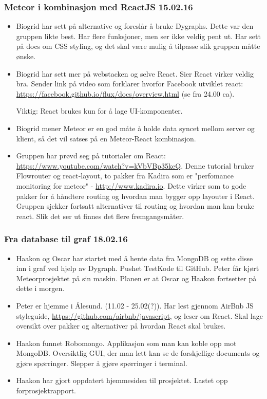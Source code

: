 \documentclass[12pt, oneside]{article}
\begin{document}
\subsubsection{Meteor i kombinasjon med ReactJS 15.02.16}
\begin{itemize}
	\item Biogrid har sett på alternative og foreslår å bruke Dygraphs. Dette var den gruppen likte best. Har flere funksjoner, men ser ikke veldig pent 		ut. Har sett på 		docs om CSS styling, og det skal være mulig å tilpasse slik gruppen måtte ønske.
	\item Biogrid har sett mer på webstacken og selve React. Sier React virker veldig bra. Sender link på video som forklarer hvorfor Facebook 			utviklet react: 		\url{https://facebook.github.io/flux/docs/overview.html} (se fra 24.00 ca).
	
		Viktig: React brukes kun for å lage UI-komponenter.
	\item Biogrid mener Meteor er en god måte å holde data syncet mellom server og klient, så det vil satses på en Meteor-React kombinasjon. 
	\item Gruppen har prøvd seg på tutorialer om React:\\
		\url{https://www.youtube.com/watch?v=kVbVBp35keQ}. Denne tutorial bruker Flowrouter og react-layout, to pakker fra Kadira som er "perfomance monitoring for meteor" - \url{http://www.kadira.io}. Dette virker som to gode pakker for å håndtere routing og hvordan man bygger opp layouter i React. Gruppen sjekker fortsatt alternativer til routing og hvordan man kan bruke react. Slik det ser ut finnes det flere fremgangsmåter.
\end{itemize}



\subsubsection{Fra database til graf 18.02.16}
\begin{itemize}
	\item Haakon og Oscar har startet med å hente data fra MongoDB og sette disse inn i graf ved hjelp av Dygraph. Pushet TestKode til GitHub. Peter får kjørt 			Meteorprosjektet på sin maskin. Planen er at Oscar og Haakon fortsetter på dette i morgen.
	\item Peter er hjemme i Ålesund. (11.02 - 25.02(?)). Har lest gjennom AirBnb JS styleguide, \url{https://github.com/airbnb/javascript}, og leser om React. Skal lage oversikt over pakker og alternativer på hvordan 		React skal brukes.
	\item Haakon funnet Robomongo. Applikasjon som man kan koble opp mot MongoDB. Oversiktlig GUI, der man lett kan se de forskjellige documents og gjøre 				spørringer. Slepper å gjøre spørringer i terminal.
	\item Haakon har gjort oppdatert hjemmesiden til prosjektet. Lastet opp forprosjektrapport. 
\end{itemize}
\end{document}
